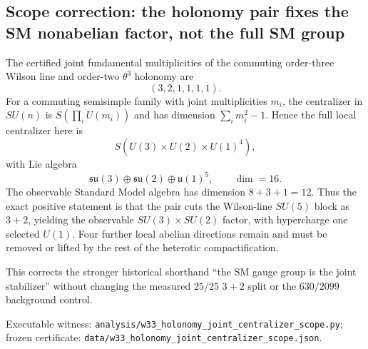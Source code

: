 \subsection{Scope correction: the holonomy pair fixes the SM nonabelian factor, not the full SM group}
\label{sec:20260919-holonomy-centralizer-scope}

The certified joint fundamental multiplicities of the commuting order-three Wilson line and order-two $\theta^3$ holonomy are
\[
(3,2,1,1,1,1).
\]
For a commuting semisimple family with joint multiplicities $m_i$, the centralizer in $SU(n)$ is $S(\prod_i U(m_i))$ and has dimension $\sum_i m_i^2-1$. Hence the full local centralizer here is
\[
S(U(3)\times U(2)\times U(1)^4),
\]
with Lie algebra
\[
\mathfrak{su}(3)\oplus\mathfrak{su}(2)\oplus\mathfrak u(1)^5,
\qquad \dim=16.
\]
The observable Standard Model algebra has dimension $8+3+1=12$. Thus the exact positive statement is that the pair cuts the Wilson-line $SU(5)$ block as $3+2$, yielding the observable $SU(3)\times SU(2)$ factor, with hypercharge one selected $U(1)$. Four further local abelian directions remain and must be removed or lifted by the rest of the heterotic compactification.

This corrects the stronger historical shorthand ``the SM gauge group is the joint stabilizer'' without changing the measured $25/25$ $3+2$ split or the $630/2099$ background control.

Executable witness: \texttt{analysis/w33\_holonomy\_joint\_centralizer\_scope.py}; frozen certificate: \texttt{data/w33\_holonomy\_joint\_centralizer\_scope.json}.
